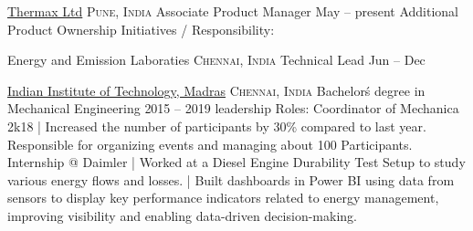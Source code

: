 \documentclass[10pt,a4paper]{article}
\begin{document}
\headedsection  %
{\href{https://www.thermaxglobal.com/}{Thermax Ltd}}
{\textsc{Pune, India}} {%
    \headedsubsection
    {Associate Product Manager}
    {May  -- present}
    {
    }
    \headedsubsection
    {Additional Product Ownership Initiatives / Responsibility:}
    {}
    {
        \bodytext{
            
        }
    }
}

\headedsection  %
{Energy and Emission Laboraties}
{\textsc{Chennai, India}} {%
    \headedsubsection
    {Technical Lead}
    {Jun  -- Dec }
    {\bodytext{}}
}

\vspace{1em}
\spacedhrule{-0.2em}{-0.4em}


\headedsection
{\href{https://www.iitm.ac.in/}{Indian Institute of Technology, Madras}}
{\textsc{Chennai, India}} {%
    \headedsubsection
    {Bachelor\'s degree in Mechanical Engineering}
    {2015 -- 2019}
    {}
    \headedsubsection
    {leadership Roles:}{}{
        \newline Coordinator of Mechanica 2k18
        \newline | Increased the number of participants by 30\% compared to last year. Responsible for organizing events and managing about 100 Participants.
    }
    \headedsubsection
    {Internship @ Daimler}{}{
        \newline | Worked at a Diesel Engine Durability Test Setup to study various energy flows and losses.
        \newline | Built dashboards in Power BI using data from sensors to display key performance indicators related to energy management, improving visibility and enabling data-driven decision-making.
    }
}
\end{document}
